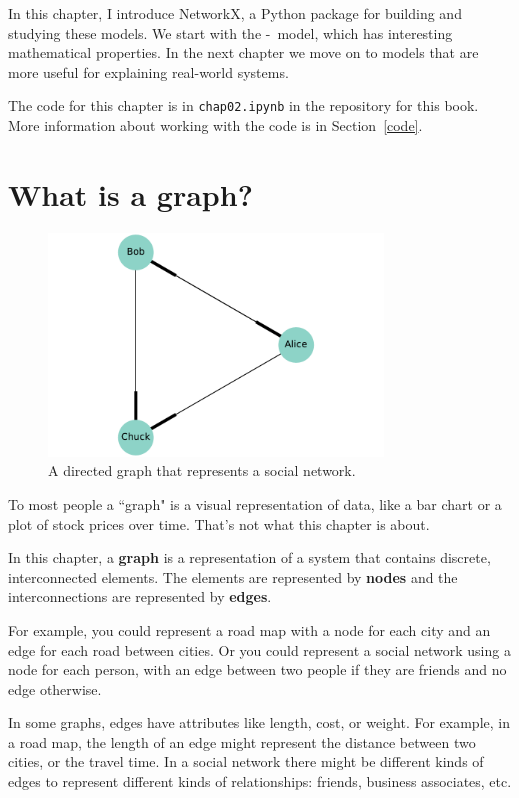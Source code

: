 \documentclass[12pt]{book}
\theoremstyle{exercise}
\begin{document}
In this chapter, I introduce NetworkX, a Python package for building
and studying these models.  We start with the \Erdos-\Renyi~model,
which has interesting mathematical properties.  In the next
chapter we move on to models that are more useful for explaining
real-world systems.

The code for this chapter is in {\tt chap02.ipynb} in the repository
for this book.  More information about working with the code is
in Section~\ref{code}.


\section{What is a graph?}

\begin{figure}
\centerline{\includegraphics[width=3.5in]{figs/chap02-1.pdf}}
\caption{A directed graph that represents a social network.}
\label{chap02-1}
\end{figure}

To most people a ``graph" is a visual representation of data, like
a bar chart or a plot of stock prices over time.  That's not what this
chapter is about.  

In this chapter, a {\bf graph} is a representation of
a system that contains discrete, interconnected elements.  The
elements are represented by {\bf nodes}
and the interconnections are represented by {\bf edges}.

For example, you could represent a road map with a node for each
city and an edge for each road between cities.  Or you could
represent a social network using a node for each person, with an
edge between two people if they are friends and no edge otherwise.

In some graphs, edges have attributes like length, cost, or weight.
For example, in a road map, the length of an edge might represent the
distance between two cities, or the travel time.  In a
social network there might be different kinds of edges to represent
different kinds of relationships: friends, business associates, etc.
 
\end{document}
